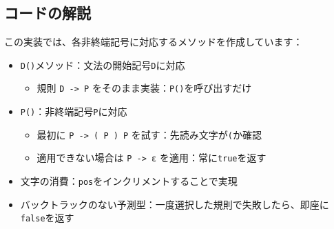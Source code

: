 \begin{Shaded}
\begin{Highlighting}[]
      \NormalTok{() \{}
        \CharTok{\textquotesingle{}(\textquotesingle{}}\NormalTok{) \{}
            \NormalTok{ (!}\NormalTok{()) } \NormalTok{;}
            \CharTok{\textquotesingle{})\textquotesingle{}}\NormalTok{) \{}
                 \NormalTok{();}
\NormalTok{            \} }\NormalTok{ \{}
                 \NormalTok{;}
\NormalTok{            \}}
\NormalTok{        \} }\NormalTok{ \{}
             \NormalTok{;}
\NormalTok{        \}}
\NormalTok{    \}}
\NormalTok{\}}
\end{Highlighting}
\end{Shaded}

\hypertarget{chapter5-ux30b3ux30fcux30c9ux306eux89e3ux8aac}{%
\subsection{コードの解説}\label{chapter5-ux30b3ux30fcux30c9ux306eux89e3ux8aac}}

この実装では、各非終端記号に対応するメソッドを作成しています：

\begin{itemize}
\item
  \texttt{D()}メソッド：文法の開始記号\texttt{D}に対応

  \begin{itemize}
  \tightlist
  \item
    規則 \texttt{D\ -\textgreater{}\ P}
    をそのまま実装：\texttt{P()}を呼び出すだけ
  \end{itemize}
\item
  \texttt{P()}：非終端記号\texttt{P}に対応

  \begin{itemize}
  \tightlist
  \item
    最初に \texttt{P\ -\textgreater{}\ (\ P\ )\ P}
    を試す：先読み文字が\texttt{(}か確認
  \item
    適用できない場合は \texttt{P\ -\textgreater{}\ ε}
    を適用：常に\texttt{true}を返す
  \end{itemize}
\item
  文字の消費：\texttt{pos}をインクリメントすることで実現
\item
  バックトラックのない予測型：一度選択した規則で失敗したら、即座に\texttt{false}を返す
\end{itemize}

